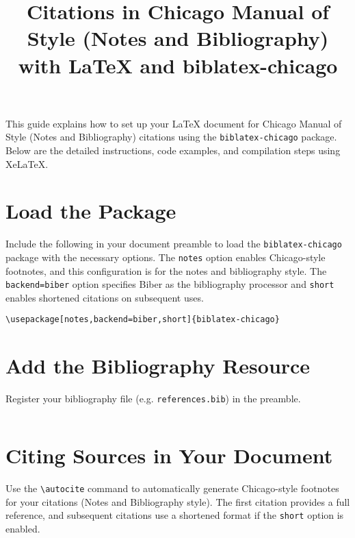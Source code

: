 \documentclass{article}
\title{Citations in Chicago Manual of Style (Notes and Bibliography) with LaTeX and biblatex-chicago}
\author{}
\date{}
\begin{document}
\maketitle

This guide explains how to set up your LaTeX document for Chicago Manual of Style (Notes and Bibliography) citations using the \texttt{biblatex-chicago} package. Below are the detailed instructions, code examples, and compilation steps using XeLaTeX.

\vspace{1em}

\section{Load the Package}

Include the following in your document preamble to load the \texttt{biblatex-chicago} package with the necessary options. The \texttt{notes} option enables Chicago-style footnotes, and this configuration is for the notes and bibliography style. The \texttt{backend=biber} option specifies Biber as the bibliography processor and \texttt{short} enables shortened citations on subsequent uses.

\begin{lstlisting}
\usepackage[notes,backend=biber,short]{biblatex-chicago}
\end{lstlisting}

\vspace{1em}

\section{Add the Bibliography Resource}

Register your bibliography file (e.g. \texttt{references.bib}) in the preamble.

\begin{lstlisting}

\end{lstlisting}

\vspace{1em}

\section{Citing Sources in Your Document}

Use the \verb|\autocite| command to automatically generate Chicago-style footnotes for your citations (Notes and Bibliography style). The first citation provides a full reference, and subsequent citations use a shortened format if the \texttt{short} option is enabled.
\end{document}
